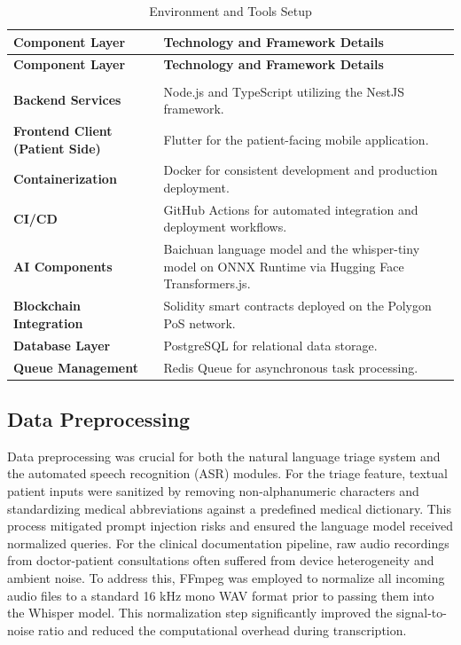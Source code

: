 \vspace{3mm}
{
\renewcommand{\arraystretch}{1.3}
\begin{xltabular}{\textwidth}{|>{\raggedright\arraybackslash}p{4.5cm}|>{\raggedright\arraybackslash}X|}
\hline
\textbf{Component Layer} & \textbf{Technology and Framework Details} \\
\hline
\endfirsthead
\hline
\textbf{Component Layer} & \textbf{Technology and Framework Details} \\
\hline
\endhead
\hline
\caption{Environment and Tools Setup} \label{tab:env_setup} \\
\endlastfoot
\textbf{Backend Services} & Node.js and TypeScript utilizing the NestJS framework. \\
\hline
\textbf{Frontend Client (Patient Side)} & Flutter for the patient-facing mobile application. \\
\hline
\textbf{Containerization} & Docker for consistent development and production deployment. \\
\hline
\textbf{CI/CD} & GitHub Actions for automated integration and deployment workflows. \\
\hline
\textbf{AI Components} & Baichuan language model and the whisper-tiny model on ONNX Runtime via Hugging Face Transformers.js. \\
\hline
\textbf{Blockchain Integration} & Solidity smart contracts deployed on the Polygon PoS network. \\
\hline
\textbf{Database Layer} & PostgreSQL for relational data storage. \\
\hline
\textbf{Queue Management} & Redis Queue for asynchronous task processing. \\
\hline
\end{xltabular}
}

\subsection{Data Preprocessing}
Data preprocessing was crucial for both the natural language triage system and the automated speech recognition (ASR) modules. For the triage feature, textual patient inputs were sanitized by removing non-alphanumeric characters and standardizing medical abbreviations against a predefined medical dictionary. This process mitigated prompt injection risks and ensured the language model received normalized queries. For the clinical documentation pipeline, raw audio recordings from doctor-patient consultations often suffered from device heterogeneity and ambient noise. To address this, FFmpeg was employed to normalize all incoming audio files to a standard 16 kHz mono WAV format prior to passing them into the Whisper model. This normalization step significantly improved the signal-to-noise ratio and reduced the computational overhead during transcription.

